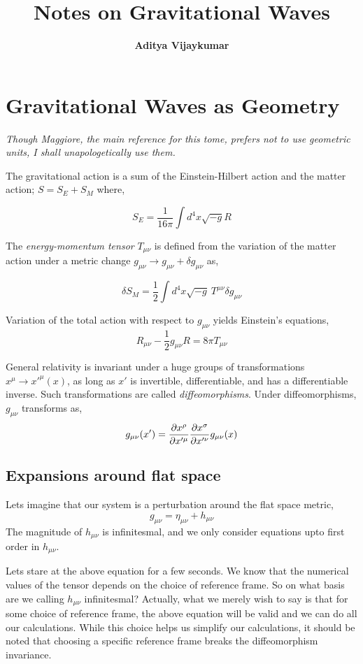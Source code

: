 \documentclass[a4paper,11pt]{report}
\title{\textbf{Notes on Gravitational Waves}}
\author{\textbf{Aditya Vijaykumar}}
\begin{document}
\maketitle \tableofcontents

\chapter{Gravitational Waves as Geometry}

\textit{Though Maggiore, the main reference for this tome, prefers not to use geometric units, I shall unapologetically use them.}

The gravitational action is a sum of the Einstein-Hilbert action and the matter action; $S = S_E + S_M$ where,

$$S_E = \frac{1}{16 \pi} \int d^4 x \sqrt{-g}R$$

The \textit{energy-momentum tensor} $T_{\mu \nu}$ is defined from the variation of the matter action under a metric change $g_{\mu \nu} \rightarrow g_{\mu \nu} + \delta g_{\mu \nu}$ as,

$$\delta S_M = \frac{1}{2}  \int d^4 x \sqrt{-g} \ T^{\mu \nu} \delta g_{\mu \nu}$$

Variation of the total action with respect to $g_{\mu \nu}$ yields Einstein's equations,
$$\boxed{R_{\mu \nu} - \frac{1}{2}g_{\mu \nu}R = 8 \pi T_{\mu \nu}}$$

General relativity is invariant under a huge groups of transformations $x^\mu \rightarrow x'^\mu(x)$, as long as $x'$ is invertible, differentiable, and has a differentiable inverse. Such transformations are called \textit{diffeomorphisms}. Under diffeomorphisms, $g_{\mu \nu}$ transforms as,
$$g_{\mu \nu}(x') = \pdv{x^\rho}{x'^\mu} \pdv{x^\sigma}{x'^\nu} g_{\mu \nu}(x)$$

\section{Expansions around flat space}
Lets imagine that our system is a perturbation around the flat space metric,
$$g_{\mu \nu} = \eta_{\mu \nu} + h_{\mu \nu}$$
The magnitude of $h_{\mu \nu}$ is infinitesmal, and we only consider equations upto first order in $h_{\mu \nu}$.

Lets stare at the above equation for a few seconds. We know that the numerical values of the tensor depends on the choice of reference frame. So on what basis are we calling $h_{\mu \nu}$ infinitesmal? Actually, what we merely wish to say is that for some choice of reference frame, the above equation will be valid and we can do all our calculations. While this choice helps us simplify our calculations, it should be noted that choosing a specific reference frame breaks the diffeomorphism invariance.
\end{document}
